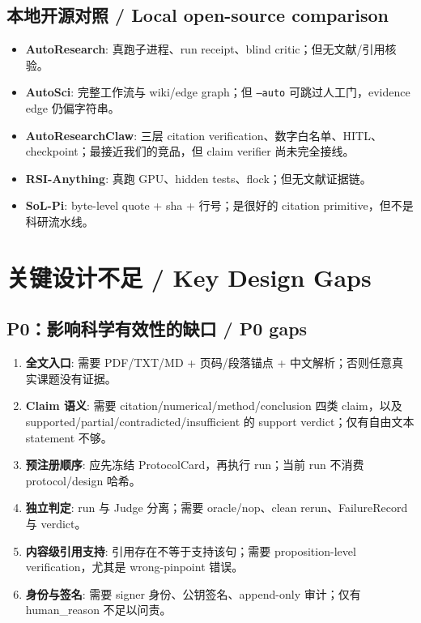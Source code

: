\documentclass[UTF8,11pt]{ctexart}
\begin{document}
\subsection{本地开源对照 / Local open-source comparison}
\begin{itemize}[leftmargin=1.4em]
\item \textbf{AutoResearch}: 真跑子进程、run receipt、blind critic；但无文献/引用核验。
\item \textbf{AutoSci}: 完整工作流与 wiki/edge graph；但 \texttt{--auto} 可跳过人工门，evidence edge 仍偏字符串。
\item \textbf{AutoResearchClaw}: 三层 citation verification、数字白名单、HITL、checkpoint；最接近我们的竞品，但 claim verifier 尚未完全接线。
\item \textbf{RSI-Anything}: 真跑 GPU、hidden tests、flock；但无文献证据链。
\item \textbf{SoL-Pi}: byte-level quote + sha + 行号；是很好的 citation primitive，但不是科研流水线。
\end{itemize}

\section{关键设计不足 / Key Design Gaps}

\subsection{P0：影响科学有效性的缺口 / P0 gaps}
\begin{enumerate}[leftmargin=1.4em]
\item \textbf{全文入口}: 需要 PDF/TXT/MD + 页码/段落锚点 + 中文解析；否则任意真实课题没有证据。
\item \textbf{Claim 语义}: 需要 citation/numerical/method/conclusion 四类 claim，以及 supported/partial/contradicted/insufficient 的 support verdict；仅有自由文本 statement 不够。
\item \textbf{预注册顺序}: 应先冻结 ProtocolCard，再执行 run；当前 run 不消费 protocol/design 哈希。
\item \textbf{独立判定}: run 与 Judge 分离；需要 oracle/nop、clean rerun、FailureRecord 与 verdict。
\item \textbf{内容级引用支持}: 引用存在不等于支持该句；需要 proposition-level verification，尤其是 wrong-pinpoint 错误。
\item \textbf{身份与签名}: 需要 signer 身份、公钥签名、append-only 审计；仅有 human\_reason 不足以问责。
\end{enumerate}
\end{document}
